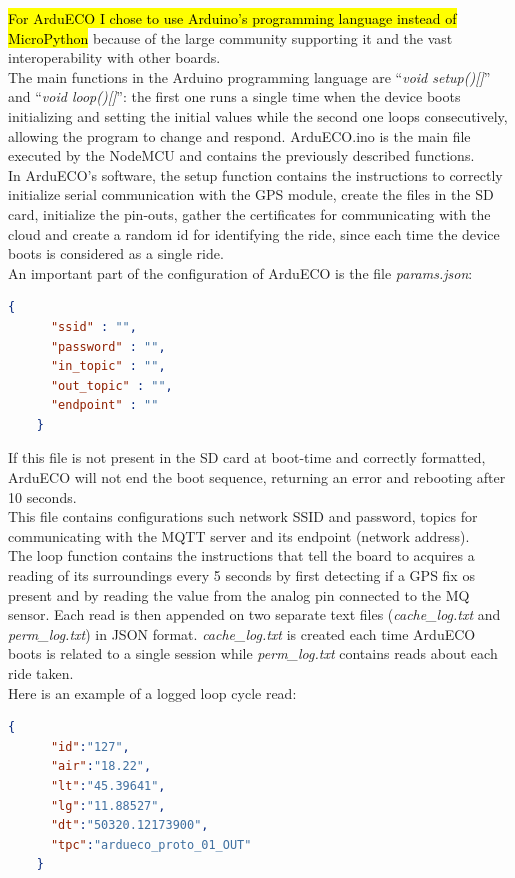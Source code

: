 \documentclass[conference]{IEEEtran}
\DeclareRobustCommand{\hlcyan}[1]{{\sethlcolor{cyan}\hl{#1}}}
\begin{document}
		\hlcyan{For ArduECO I chose to use Arduino's programming language instead of MicroPython}\cite{micropyhton} because of the large community supporting it and the vast interoperability with other boards.\\
		The main functions in the Arduino programming language are ``\textit{void setup()[]}'' and ``\textit{void loop()[]}'': the first one runs a single time when the device boots initializing and setting the initial values while the second one loops consecutively, allowing the program to change and respond.
		ArduECO.ino is the main file executed by the NodeMCU and contains the previously described functions.\\
		In ArduECO's software, the setup function contains the instructions to correctly initialize serial communication with the GPS module, create the files in the SD card, initialize the pin-outs, gather the certificates for communicating with the cloud and create a random id for identifying the ride, since each time the device boots is considered as a single ride.\\
		An important part of the configuration of ArduECO is the file \textit{params.json}:
		\begin{lstlisting}[language=json,firstnumber=1]
    {
	  "ssid" : "",
	  "password" : "",
	  "in_topic" : "",
	  "out_topic" : "",
	  "endpoint" : ""
    }
		\end{lstlisting}
		If this file is not present in the SD card at boot-time and correctly formatted, ArduECO will not end the boot sequence, returning an error and rebooting after 10 seconds.\\
		This file contains configurations such network SSID and password, topics for communicating with the MQTT server and its endpoint (network address).\\
		The loop function contains the instructions that tell the board to acquires a reading of its surroundings every 5 seconds by first detecting if a GPS fix os present and by reading the value from the analog pin connected to the MQ sensor.
		Each read is then appended on two separate text files (\textit{cache\_log.txt} and \textit{perm\_log.txt}) in JSON format. 
		\textit{cache\_log.txt} is created each time ArduECO boots is related to a single session while \textit{perm\_log.txt} contains reads about each ride taken.\\
		Here is an example of a logged loop cycle read:
		\begin{lstlisting}[language=json,firstnumber=1]		
    {
	  "id":"127",
	  "air":"18.22",
	  "lt":"45.39641",
	  "lg":"11.88527",
	  "dt":"50320.12173900",
	  "tpc":"ardueco_proto_01_OUT"
    }
		\end{lstlisting}	
\end{document}
